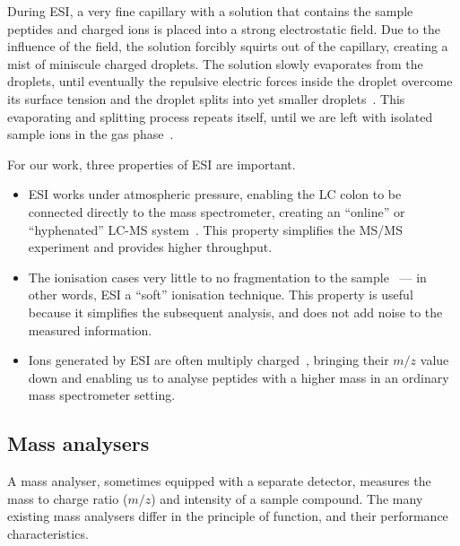 During ESI, a very fine capillary with a solution that contains the sample peptides and charged ions is placed into a strong electrostatic field. Due to the influence of the field, the solution forcibly squirts out of the capillary, creating a mist of miniscule charged droplets. The solution slowly evaporates from the droplets, until eventually the repulsive electric forces inside the droplet overcome its surface tension and the droplet splits into yet smaller droplets~\cite{rayleigh1882xx}. This evaporating and splitting process repeats itself, until we are left with isolated sample ions in the gas phase~\cite{dole1968molecular,dole1968gas,fenn1989electrospray, fenn1990electrospray}.

For our work, three properties of ESI are important.

\begin{itemize}
  \item ESI works under atmospheric pressure, enabling the LC colon to be connected directly to the mass spectrometer, creating an ``online'' or ``hyphenated'' LC-MS system~\cite{opiteck1997comprehensive}. This property simplifies the MS/MS experiment and provides higher throughput.
  \item The ionisation cases very little to no fragmentation to the sample~\cite{griffiths2001electrospray} --- in other words, ESI a ``soft'' ionisation technique. This property is useful because it simplifies the subsequent analysis, and does not add noise to the measured information.
  \item  Ions generated by ESI are often multiply charged~\cite{felitsyn2002origin}, bringing their \(m/z\) value down and enabling us to analyse peptides with a higher mass in an ordinary mass spectrometer setting.
\end{itemize}

\subsection{Mass analysers}\label{sec:msms-analysis}

A mass analyser, sometimes equipped with a separate detector, measures the mass to charge ratio (\(m/z\)) and intensity of a sample compound. The many existing mass analysers differ in the principle of function, and their performance characteristics.

